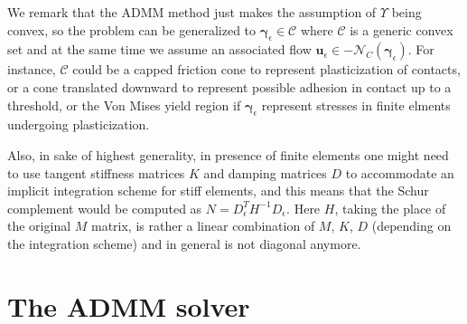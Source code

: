 \documentclass{svproc}
\newcommand{\vect}[1]{\bm{#1}}
\begin{document}
We remark that the ADMM method just makes the assumption of $\Upsilon$ being convex, so the problem can be generalized to $\vect{\gamma}_\epsilon \in \mathcal{C}$ where $\mathcal{C}$ is a generic convex set and at the same time we assume an associated 
flow $\vect{u}_\epsilon \in - \mathcal{N}_{C}(\vect{\gamma}_\epsilon)$. For instance, $\mathcal{C}$ could be a capped friction cone to represent plasticization of contacts, or a cone translated downward to represent possible adhesion in contact up to a threshold, or the Von Mises yield region if $\vect{\gamma}_\epsilon$ represent stresses in finite elments undergoing plasticization. 

Also, in sake of highest generality, in presence of finite elements one might need to use tangent stiffness matrices $K$ and damping matrices $D$ to accommodate an implicit integration scheme for stiff elements, and this means that the Schur complement would be computed as $N=D_{\epsilon}^T H^{-1} D_{\epsilon}$. Here $H$, taking the place of the original $M$ matrix, is rather a linear combination of $M$, $K$, $D$ (depending on the integration scheme) and in general is not diagonal anymore. 



\section{The ADMM solver}
\end{document}

